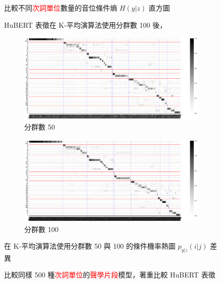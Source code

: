 {\begin{figure}
            \caption{HuBERT 表徵在 K-平均演算法使用分群數 100 後，}
            比較不同\textcolor{red}{次詞單位}數量的音位條件熵 $H(y|z)$ 直方圖
            \label{fig:hub-u100-hist-comparisons}
        \end{figure}
    }

    {
        \begin{figure}
             \centering
             \begin{subfigure}{\textwidth}
                 \centering
                 \includegraphics[width=1\linewidth]{figures/ch4figs/hub-u050-ap0500-givenunit-byphn.png}
                 \caption{分群數 50}
                 \label{fig:hub-u050-ap0500-givenunit-byphn--picked}
             \end{subfigure}
             \vfill
             \begin{subfigure}{\textwidth}
                 \centering
                 \includegraphics[width=1\linewidth]{figures/ch4figs/hub-u050-ap1000-givenunit-byphn.png}
                 \caption{分群數 100}
                 \label{fig:hub-u100-ap0500-givenunit-byphn--picked}
             \end{subfigure}
             \caption{比較同樣 500 種\textcolor{red}{次詞單位}的\textcolor{red}{聲學片段}模型，著重比較 HuBERT 表徵}
             在 K-平均演算法使用分群數 50 與 100 的條件機率熱圖 $p_{y|z}(i|j)$ 差異
             \label{fig:check-ap0500}
        \end{figure}
    }


